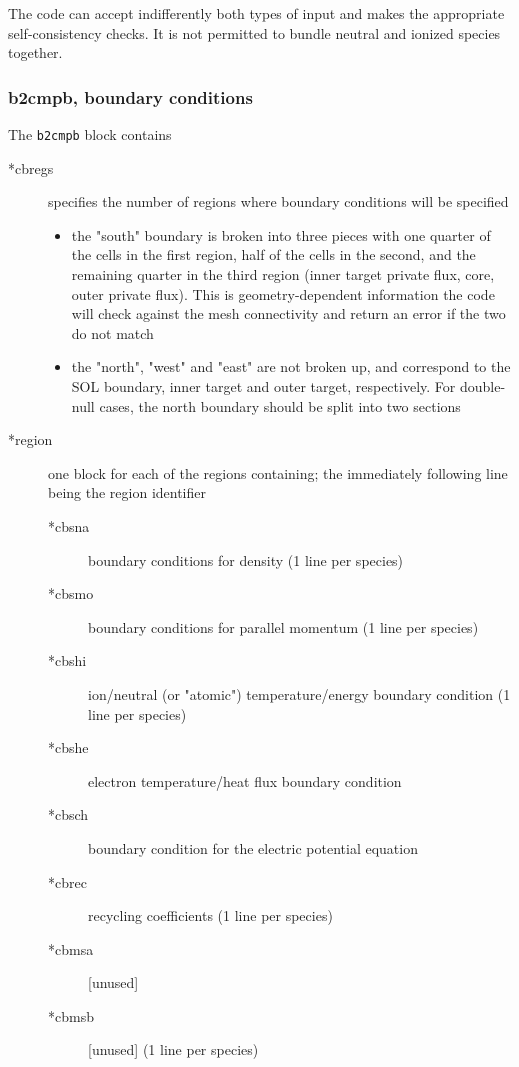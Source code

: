 \documentclass[a4paper,10pt]{report}
\begin{document}
The code can accept indifferently both types of input and makes the
appropriate self-consistency checks. It is not permitted to bundle
neutral and ionized species together.

\subsubsection{b2cmpb, boundary conditions}

The {\tt b2cmpb} block contains
\begin{description}
\item[*cbregs] specifies the number of regions where boundary
  conditions will be specified
  \begin{itemize}
  \item the "south" boundary is broken into three pieces with one
    quarter of the cells in the first region, half of the cells in the
    second, and the remaining quarter in the third region (inner
    target private flux, core, outer private flux). This is geometry-dependent
    information the code will check against the mesh connectivity and
    return an error if the two do not match
  \item the "north", "west" and "east" are not broken up, and
    correspond to the SOL boundary, inner target and outer target,
    respectively. For double-null cases, the north boundary should
    be split into two sections
  \end{itemize}
\item[*region] one block for each of the regions containing; the
  immediately following line being the region identifier
  \begin{description}
    \item[*cbsna] boundary conditions for density (1 line per species)
    \item[*cbsmo] boundary conditions for parallel momentum (1 line per species)
    \item[*cbshi] ion/neutral (or "atomic") temperature/energy
    boundary condition (1 line per species)
    \item[*cbshe] electron temperature/heat flux boundary condition
    \item[*cbsch] boundary condition for the electric potential equation
    \item[*cbrec] recycling coefficients (1 line per species)
    \item[*cbmsa] [unused]
    \item[*cbmsb] [unused] (1 line per species)
  \end{description}
\end{description}
\end{document}

